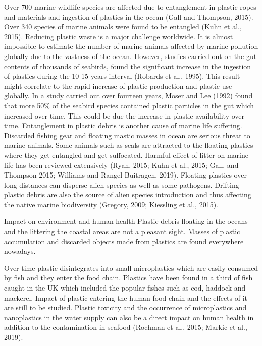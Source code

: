 \documentclass[10pt]{article}\usepackage[]{graphicx}\usepackage[]{color}
\begin{document}
Over 700 marine wildlife species are affected due to entanglement in plastic ropes and materials and ingestion of plastics in the ocean (Gall and Thompson, 2015). Over 340 species of marine animals were found to be entangled (Kuhn et al., 2015). Reducing plastic waste is a major challenge worldwide. It is almost impossible to estimate the number of marine animals affected by marine pollution globally due to the vastness of the ocean. However, studies carried out on the gut contents of thousands of seabirds, found the significant increase in the ingestion of plastics during the 10-15 years interval (Robards et al., 1995). This result might correlate to the rapid increase of plastic production and plastic use globally.  In a study carried out over fourteen years, Moser and Lee (1992) found that more 50\% of the seabird species contained plastic particles in the gut which increased over time. This could be due the increase in plastic availability over time. 
Entanglement in plastic debris is another cause of marine life suffering. Discarded fishing gear and floating mastic masses in ocean are serious threat to marine animals. Some animals such as seals are attracted to the floating plastics where they get entangled and get suffocated. Harmful effect of litter on marine life has been reviewed extensively (Ryan, 2015; Kuhn et al., 2015; Gall, and Thompson 2015; Williams and Rangel-Buitragen, 2019). Floating plastics over long distances can disperse alien species as well as some pathogens. Drifting plastic debris are also the source of alien species introduction and thus affecting the native marine biodiversity (Gregory, 2009; Kiessling et al., 2015). 

Impact on environment and human health
Plastic debris floating in the oceans and the littering the coastal areas are not a pleasant sight. Masses of plastic accumulation and discarded objects made from plastics are found everywhere nowadays. 

Over time plastic disintegrates into small microplastics which are easily consumed by fish and they enter the food chain. Plastics have been found in a third of fish caught in the UK which included the popular fishes such as cod, haddock and mackerel. Impact of plastic entering the human food chain and the effects of it are still to be studied.  Plastic toxicity and the occurrence of microplastics and nanoplastics in the water supply can also be a direct impact on human health in addition to the contamination in seafood (Rochman et al., 2015; Markic et al., 2019).
\end{document}
